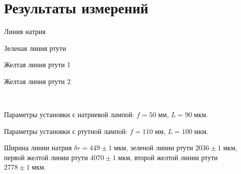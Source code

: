 \newpage
\section{Результаты измерений}

\begin{table}[!ht]
    \centering
    \caption{Линия натрия}
    
\end{table}

\begin{table}[!ht]
    \centering
    \caption{Зеленая линия ртути}
    
\end{table}

\begin{table}[!ht]
    \centering
    \caption{Желтая линия ртути 1}
    
\end{table}

\begin{table}[!ht]
    \centering
    \caption{Желтая линия ртути 2}
    
\end{table}

\newpage
~
\newpage

Параметры установки с натриевой лампой: $f = 50\;\text{мм}$, $L = 90\;\text{мкм}$.

Параметры установки с ртутной лампой: $f = 110\;\text{мм}$, $L = 100\;\text{мкм}$.

Ширина линии натрия $\delta r = 449 \pm 1\;\text{мкм}$, зеленой линии ртути $2036 \pm 1\;\text{мкм}$, первой желтой линии ртути $4070 \pm 1\;\text{мкм}$, второй желтой линии ртути $2778 \pm 1\;\text{мкм}$.


